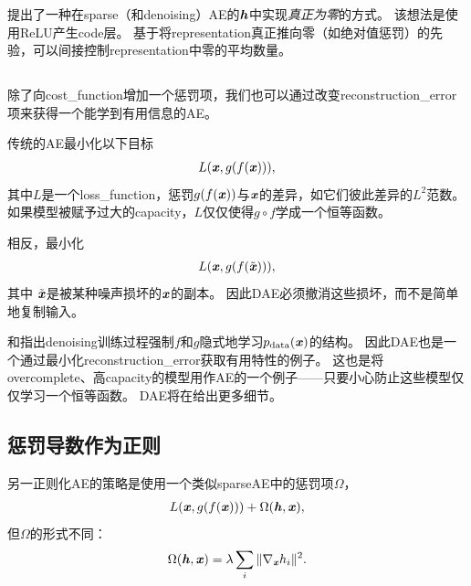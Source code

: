 \citet{Glorot+al-ICML-2011-small}提出了一种在\gls{sparse}（和\gls{denoising}）\gls{AE}的$\boldsymbol{\mathit{h}}$中实现\emph{真正为零}的方式。
该想法是使用\gls{ReLU}产生\gls{code}层。
基于将\gls{representation}真正推向零（如绝对值惩罚）的先验，可以间接控制\gls{representation}中零的平均数量。



\subsection{}
\label{sec:sub_denoising_autoencoders}
除了向\gls{cost_function}增加一个惩罚项，我们也可以通过改变\gls{reconstruction_error}项来获得一个能学到有用信息的\gls{AE}。


传统的\gls{AE}最小化以下目标
\begin{align}
    L(\boldsymbol{\mathit{x}}, g(f(\boldsymbol{\mathit{x}}))),
\end{align}
其中$L$是一个\gls{loss_function}，惩罚$g(f(\boldsymbol{\mathit{x}}))$与$\boldsymbol{\mathit{x}}$的差异，如它们彼此差异的$L^2$范数。
如果模型被赋予过大的\gls{capacity}，$L$仅仅使得$g \circ  f$学成一个恒等函数。


相反，最小化 
\begin{align}
    L(\boldsymbol{\mathit{x}}, g(f(\tilde {\boldsymbol{\mathit{x}}}))),
\end{align}
其中 $\tilde {\boldsymbol{\mathit{x}}}$是被某种噪声损坏的$\boldsymbol{\mathit{x}}$的副本。
因此\gls{DAE}必须撤消这些损坏，而不是简单地复制输入。

\citet{Alain+Bengio-ICLR2013-small}和\citet{Bengio-et-al-NIPS2013-small}指出\gls{denoising}训练过程强制$f$和$g$隐式地学习$p_{\text{data}} (\boldsymbol{\mathit{x}})$的结构。
因此\gls{DAE}也是一个通过最小化\gls{reconstruction_error}获取有用特性的例子。
这也是将\gls{overcomplete}、高\gls{capacity}的模型用作\gls{AE}的一个例子——只要小心防止这些模型仅仅学习一个恒等函数。
\gls{DAE}将在给出更多细节。


\subsection{惩罚导数作为正则}
\label{sec:regularizing_by_penalizing_derivatives}
另一正则化\gls{AE}的策略是使用一个类似\gls{sparse}\gls{AE}中的惩罚项$\Omega$，
\begin{align}
    L(\boldsymbol{\mathit{x}}, g(f(\boldsymbol{\mathit{x}}))) + \Omega(\boldsymbol{\mathit{h}}, \boldsymbol{\mathit{x}}),
\end{align}
但$\Omega$的形式不同：
\begin{align}
\Omega(\boldsymbol{\mathit{h}}, \boldsymbol{\mathit{x}}) = \lambda \sum_i \| \nabla_{\boldsymbol{\mathit{x}}}h_i \|^2.
\end{align}


